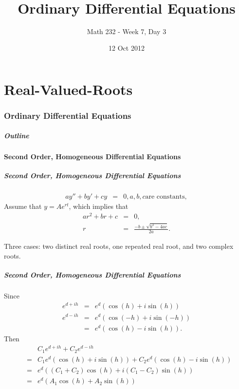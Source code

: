 \part{Real-Valued-Roots}
\section{Ordinary Differential Equations}

\title{Ordinary Differential Equations}
\subtitle{Math 232 - Week 7, Day 3}
\date{12 Oct 2012}

\begin{frame}
  \titlepage
\end{frame}

\begin{frame}
  \frametitle{Outline}
  \tableofcontents[ currentsection ]
\end{frame}


\subsection{Second Order, Homogeneous Differential Equations}


\begin{frame}
  \frametitle{Second Order, Homogeneous Differential Equations}

  \begin{eqnarray*}
    a y'' + by' + cy & = & 0, a, b, c \text{are constants}, 
  \end{eqnarray*}
  Assume that $y =  A e^{rt}$, 
  which implies that
  \begin{eqnarray*}
    a r^2 + b r + c & = & 0, \\
    r & = & \frac{-b\pm\sqrt{b^2-4ac}}{2a}.
  \end{eqnarray*}

  Three cases: two distinct real roots, one repeated real root, and
  two complex roots.

\end{frame}

\begin{frame}
  \frametitle{Second Order, Homogeneous Differential Equations}
Since 
  \begin{eqnarray*}
  e^{d+ih} & = & e^d\left(\cos(h)+i\sin(h)\right) \\ 
  e^{d-ih} & = & e^d\left(\cos(-h)+i\sin(-h)\right)  \\
           & = & e^d\left(\cos(h)-i\sin(h)\right).  
  \end{eqnarray*}
Then  
  \begin{eqnarray*}
   &   &  C_1e^{d+ih} + C_2e^{d-ih}\\
   & = & C_1e^d\left(\cos(h)+i\sin(h)\right) 
       + C_2 e^d\left(\cos(h)-i\sin(h)\right)\\
   & = & e^d\left((C_1+C_2)\cos(h)+i(C_1-C_2)\sin(h)\right)\\
   & = & e^d\left(A_1\cos(h)+A_2\sin(h)\right)  
  \end{eqnarray*}

\end{frame}

